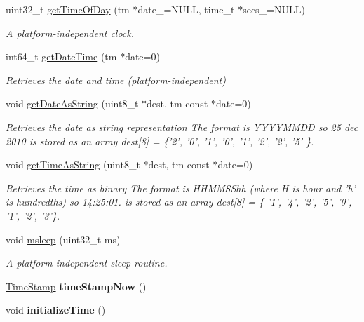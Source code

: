 \begin{DoxyCompactItemize}
\item 
uint32\-\_\-t \hyperlink{namespacexsens_a00d5dce92611428c34961bee5893155f}{get\-Time\-Of\-Day} (tm $\ast$date\-\_\-=\-N\-U\-L\-L, time\-\_\-t $\ast$secs\-\_\-=\-N\-U\-L\-L)
\begin{DoxyCompactList}\small\item\em \-A platform-\/independent clock. \end{DoxyCompactList}\item 
int64\-\_\-t \hyperlink{namespacexsens_a783df0e55e9d5e5489d8da5b8bf62b2f}{get\-Date\-Time} (tm $\ast$date=0)
\begin{DoxyCompactList}\small\item\em \-Retrieves the date and time (platform-\/independent) \end{DoxyCompactList}\item 
void \hyperlink{namespacexsens_abb018ee35ad70d152160996633f6ee93}{get\-Date\-As\-String} (uint8\-\_\-t $\ast$dest, tm const $\ast$date=0)
\begin{DoxyCompactList}\small\item\em \-Retrieves the date as string representation \-The format is \-Y\-Y\-Y\-Y\-M\-M\-D\-D so 25 dec 2010 is stored as an array dest\mbox{[}8\mbox{]} = \{'2', '0', '1', '0', '1', '2', '2', '5' \}. \end{DoxyCompactList}\item 
void \hyperlink{namespacexsens_aeb73781a5d94756df21f5acead8c3c2c}{get\-Time\-As\-String} (uint8\-\_\-t $\ast$dest, tm const $\ast$date=0)
\begin{DoxyCompactList}\small\item\em \-Retrieves the time as binary \-The format is \-H\-H\-M\-M\-S\-Shh (where \-H is hour and 'h' is hundredths) so 14\-:25\-:01. is stored as an array dest\mbox{[}8\mbox{]} = \{ '1', '4', '2', '5', '0', '1', '2', '3'\}. \end{DoxyCompactList}\item 
void \hyperlink{namespacexsens_aa295555a3becd9dcbb25c451c24fa01a}{msleep} (uint32\-\_\-t ms)
\begin{DoxyCompactList}\small\item\em \-A platform-\/independent sleep routine. \end{DoxyCompactList}\item 
\hypertarget{namespacexsens_a40b10e8534dffdeeac80aa9000d28b12}{\hyperlink{namespacexsens_a2679efcfb1565882c6aa789096f8878e}{\-Time\-Stamp} {\bfseries time\-Stamp\-Now} ()}\label{namespacexsens_a40b10e8534dffdeeac80aa9000d28b12}

\item 
\hypertarget{namespacexsens_a40077dfcde41daf992648f9e7c38a98f}{void {\bfseries initialize\-Time} ()}\label{namespacexsens_a40077dfcde41daf992648f9e7c38a98f}

\end{DoxyCompactItemize}
